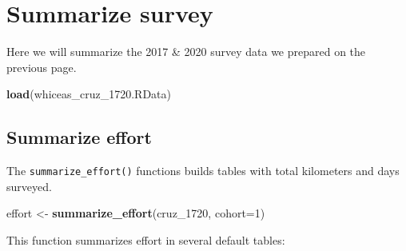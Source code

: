 \documentclass[
]{book}
\newenvironment{Shaded}{\begin{snugshade}}{\end{snugshade}}
\newcommand{\AttributeTok}[1]{\textcolor[rgb]{0.13,0.29,0.53}{#1}}
\newcommand{\DecValTok}[1]{\textcolor[rgb]{0.00,0.00,0.81}{#1}}
\newcommand{\FloatTok}[1]{\textcolor[rgb]{0.00,0.00,0.81}{#1}}
\newcommand{\FunctionTok}[1]{\textcolor[rgb]{0.13,0.29,0.53}{\textbf{#1}}}
\newcommand{\NormalTok}[1]{#1}
\newcommand{\OtherTok}[1]{\textcolor[rgb]{0.56,0.35,0.01}{#1}}
\newcommand{\SpecialCharTok}[1]{\textcolor[rgb]{0.81,0.36,0.00}{\textbf{#1}}}
\newcommand{\StringTok}[1]{\textcolor[rgb]{0.31,0.60,0.02}{#1}}
\begin{document}
\begin{Shaded}
\end{Shaded}

\hypertarget{summarize}{%
\chapter{Summarize survey}\label{summarize}}

Here we will summarize the 2017 \& 2020 survey data we prepared on the previous page.

\begin{Shaded}
\begin{Highlighting}[]
\FunctionTok{load}\NormalTok{(}\StringTok{\textquotesingle{}whiceas\_cruz\_1720.RData\textquotesingle{}}\NormalTok{)}
\end{Highlighting}
\end{Shaded}

\hypertarget{summarize-effort}{%
\section*{Summarize effort}\label{summarize-effort}}

The \texttt{summarize\_effort()} functions builds tables with total kilometers and days surveyed.

\begin{Shaded}
\begin{Highlighting}[]
\NormalTok{effort }\OtherTok{\textless{}{-}} \FunctionTok{summarize\_effort}\NormalTok{(cruz\_1720,}
                           \AttributeTok{cohort=}\DecValTok{1}\NormalTok{)}
\end{Highlighting}
\end{Shaded}

This function summarizes effort in several default tables:
\end{document}
